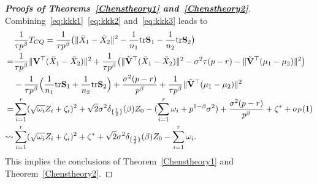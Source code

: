 \documentclass[times,sort&compress,3p]{elsarticle}
\newcommand{\mytr}{ {\rm tr} }
\theoremstyle{plain}
\theoremstyle{definition}
\theoremstyle{remark}
\begin{document}
\begin{appendices}
\begin{proof}[\textbf{Proofs of Theorems~\ref{Chenstheory1} and~\ref{Chenstheory2}}]
    Combining~\eqref{eq:kkk1}~\eqref{eq:kkk2} and~\eqref{eq:kkk3} leads to
    $$
    \begin{aligned}
        &\frac{1}{\tau p^{\beta}} T_{CQ}
        =\frac{1}{\tau p^{\beta}}\big(\|\bar{X}_1-\bar{X}_2\|^2-\frac{1}{n_1}\mytr \BS_1-\frac{1}{n_2}\mytr \BS_2\big)\\
        =&
        \frac{1}{\tau p^{\beta}}{\|\BV^\top (\bar{X}_1-\bar{X}_2)\|^2}+
        \frac{1}{\tau p^{\beta}} \big({\|\tilde{\BV}^\top (\bar{X}_1-\bar{X}_2)\|^2-\sigma^2 \tau(p-r)-\|\tilde{\BV}^\top (\mu_1-\mu_2)\|^2}\big)\\
        &-\frac{1}{\tau p^{\beta}}\Big(\frac{1}{n_1}\mytr \BS_1+\frac{1}{n_2}\mytr \BS_2\Big)+\frac{\sigma^2 (p-r)}{p^\beta}+\frac{1}{\tau p^\beta}\|\tilde{\BV}^\top (\mu_1-\mu_2)\|^2\\
        =&
        \sum_{i=1}^r (\sqrt{\omega_i} Z_i+\zeta_i)^2+
   \sqrt{2} \sigma^2 \delta_{\{\frac{1}{2}\}}(\beta)Z_0
        -
        (\sum_{i=1}^r \omega_i+p^{1-\beta}\sigma^2)
        +\frac{\sigma^2 (p-r)}{p^\beta}+\zeta^*+o_P(1)\\
        \rightsquigarrow &
        \sum_{i=1}^r (\sqrt{\omega_i} Z_i+\zeta_i)^2+
\zeta^*+
    \sqrt{2}\sigma^2 \delta_{\{\frac{1}{2}\}}(\beta)Z_0
        -
        \sum_{i=1}^r \omega_i.
    \end{aligned}
    $$
    This implies the conclusions of Theorem~\ref{Chenstheory1} and Theorem~\ref{Chenstheory2}.

%

\end{proof}


\end{appendices}
\end{document}
